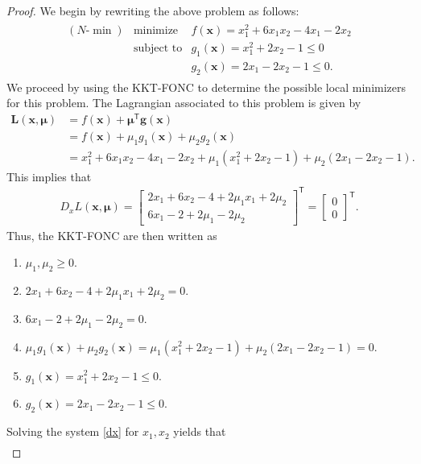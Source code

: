 \documentclass[12pt]{article}
\theoremstyle{definition}
\newcommand{\vc}[1]{\boldsymbol{#1}}
\newcommand{\tran}{\mathsf{T}}
\begin{document}
\begin{proof}
  We begin by rewriting the above problem as follows:
  \begin{align*}
    \begin{array}{rrl}
      (N\text{-}\min) & \text{minimize} & f(\vc{x}) = x_1^2 + 6x_1x_2 -4x_1 -2x_2\\
      & \text{subject to} & g_1(\vc{x}) = x_1^2 + 2x_2 -1 \leq 0\\
      & & g_2(\vc{x}) = 2x_1 -2x_2 - 1 \leq 0.
    \end{array}
  \end{align*}
  We proceed by using the KKT-FONC to determine the possible local minimizers for this problem.
  The Lagrangian associated to this problem is given by
  \begin{align*}
    \vc{L}(\vc{x}, \vc{\mu})
    &= f(\vc{x}) + \vc{\mu}^\tran \vc{g(x)} \\
    &= f(\vc{x}) + \mu_1 g_1(\vc{x}) + \mu_2 g_2(\vc{x}) \\
    &= x_1^2 + 6x_1x_2 -4x_1 -2x_2 + \mu_1(x_1^2 + 2x_2 -1) + \mu_2(2x_1 -2x_2 - 1).
  \end{align*}
  This implies that
  \begin{align}\label{dx}
    D_xL(\vc{x}, \vc{\mu}) =
    \begin{bmatrix}
      2x_1 + 6x_2 - 4 + 2\mu_1x_1 + 2\mu_2\\
      6x_1 - 2 + 2\mu_1 -2\mu_2
    \end{bmatrix}^\tran
    =
    \begin{bmatrix}
      0 \\
      0
    \end{bmatrix}^\tran.
  \end{align}
  Thus, the KKT-FONC are then written as
  \begin{enumerate}[label=\roman*.]
    \item $\mu_1, \mu_2 \geq 0$.
    \item $2x_1 + 6x_2 - 4 + 2\mu_1x_1 + 2\mu_2 = 0$.
    \item $6x_1 - 2 + 2\mu_1 -2\mu_2 = 0$.
    \item $\mu_1 g_1(\vc{x}) + \mu_2 g_2(\vc{x})  = \mu_1(x_1^2 + 2x_2 -1) + \mu_2(2x_1 -2x_2 - 1) = 0$.
    \item $g_1(\vc{x}) = x_1^2 + 2x_2 -1 \leq 0$.
    \item $g_2(\vc{x}) = 2x_1 -2x_2 - 1 \leq 0$.
  \end{enumerate}
  Solving the system \eqref{dx} for $x_1, x_2$ yields that
  \begin{align}\label{x_def}

\end{align}
\end{proof}
\end{document}
